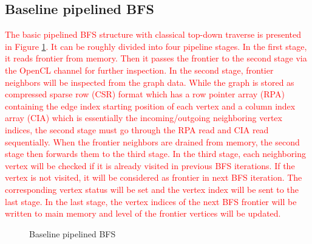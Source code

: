 \subsection{Baseline pipelined BFS}
\textcolor{red}{
The basic pipelined BFS structure with classical top-down traverse 
is presented in Figure \ref{fig:base-bfs}. It can be roughly 
divided into four pipeline stages. In the first stage, it reads 
frontier from memory. Then it passes the frontier to the second stage
via the OpenCL channel for further inspection. In the second stage, 
frontier neighbors will be inspected from the graph data. While the 
graph is stored as compressed sparse row (CSR) format which has a row 
pointer array (RPA) containing the edge index starting position of each 
vertex and a column index array (CIA) which is essentially the incoming/outgoing 
neighboring vertex indices, the second stage must go through the RPA read and 
CIA read sequentially. When the frontier neighbors are 
drained from memory, the second stage then forwards them to the third stage.
In the third stage, each neighboring vertex will be checked if it is 
already visited in previous BFS iterations. If the vertex is not visited, 
it will be considered as frontier in next BFS iteration. The corresponding 
vertex status will be set and the vertex index will be sent to the last stage.
In the last stage, the vertex indices of the next BFS frontier will be 
written to main memory and level of the frontier vertices will be updated.
}

\begin{figure}
    \caption{Baseline pipelined BFS}
\label{fig:base-bfs}
\vspace{-1em}
\end{figure}


